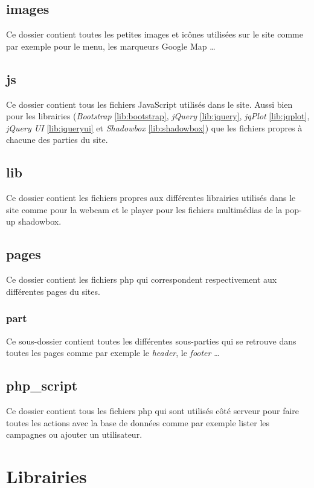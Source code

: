 \documentclass[twoside]{EPURapport}
\begin{document}
		\subsection{images}
		Ce dossier contient toutes les petites images et icônes utilisées sur le site comme par exemple pour le menu, les marqueurs Google Map \ldots
		
		\subsection{js}
		Ce dossier contient tous les fichiers JavaScript utilisés dans le site. Aussi bien pour les librairies (\emph{Bootstrap} \ref{lib:bootstrap}, \emph{jQuery} \ref{lib:jquery}, \emph{jqPlot} \ref{lib:jqplot}, \emph{jQuery UI} \ref{lib:jqueryui} et \emph{Shadowbox} \ref{lib:shadowbox}) que les fichiers propres à chacune des parties du site.
		
		\subsection{lib}
		Ce dossier contient les fichiers propres aux différentes librairies utilisés dans le site comme pour la webcam et le player pour les fichiers multimédias de la pop-up shadowbox.
		
		\subsection{pages}
		Ce dossier contient les fichiers php qui correspondent respectivement aux différentes pages du sites.
		
			\subsubsection{part}
			Ce sous-dossier contient toutes les différentes sous-parties qui se retrouve dans toutes les pages comme par exemple le \emph{header}, le \emph{footer} \ldots
		
		\subsection{php\_script}
		Ce dossier contient tous les fichiers php qui sont utilisés côté serveur pour faire toutes les actions avec la base de données comme par exemple lister les campagnes ou ajouter un utilisateur.
	
	\section{Librairies}
	\label{lib}
		
\end{document}
